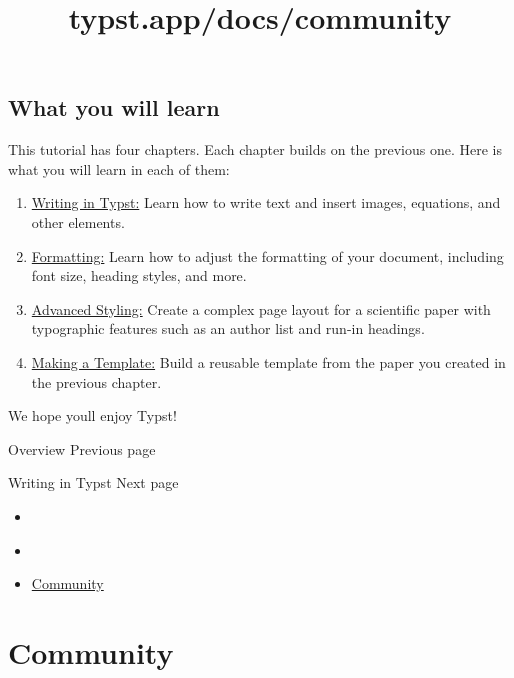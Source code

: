 \subsection{What you will learn}\label{learnings}

This tutorial has four chapters. Each chapter builds on the previous
one. Here is what you will learn in each of them:

\begin{enumerate}
\tightlist
\item
  \href{/docs/tutorial/writing-in-typst/}{Writing in Typst:} Learn how
  to write text and insert images, equations, and other elements.
\item
  \href{/docs/tutorial/formatting/}{Formatting:} Learn how to adjust the
  formatting of your document, including font size, heading styles, and
  more.
\item
  \href{/docs/tutorial/advanced-styling/}{Advanced Styling:} Create a
  complex page layout for a scientific paper with typographic features
  such as an author list and run-in headings.
\item
  \href{/docs/tutorial/making-a-template/}{Making a Template:} Build a
  reusable template from the paper you created in the previous chapter.
\end{enumerate}

We hope you\textquotesingle ll enjoy Typst!

\href{/docs/}{\pandocbounded{}}

{ Overview } { Previous page }

\href{/docs/tutorial/writing-in-typst/}{\pandocbounded{}}

{ Writing in Typst } { Next page }


\title{typst.app/docs/community}

\begin{itemize}
\tightlist
\item
  \href{/docs}{}
\item
  
\item
  \href{/docs/community/}{Community}
\end{itemize}

\section{Community}\label{community}

